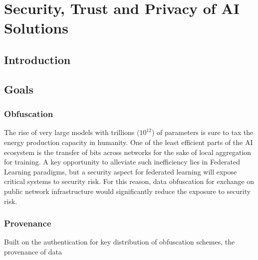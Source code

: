 
\chapter{Security, Trust and Privacy of AI Solutions}
\label{chap:security_privacy}

\lipsum[1-2]
\section{Introduction}\label{sec:security_privacy:intro}


\section{Goals}\label{sec:security_privacy:goals}
\subsection{Obfuscation}
The rise of very large models with trillions ($10^{12}$) of parameters is sure to tax the energy production capacity in humanity.  
One of the least efficient parts of the AI ecosystem is the transfer of bits across networks for the sake of local aggregation for training. 
A key opportunity to alleviate such inefficiency lies in Federated Learning paradigms, but a security aspect for federated learning will expose critical systems to security risk. 
For this reason, data obfuscation for exchange on public network infrastructure would significantly reduce the exposure to security risk. 

\subsection{Provenance} 
Built on the authentication for key distribution of obfuscation schemes, the provenance of data 